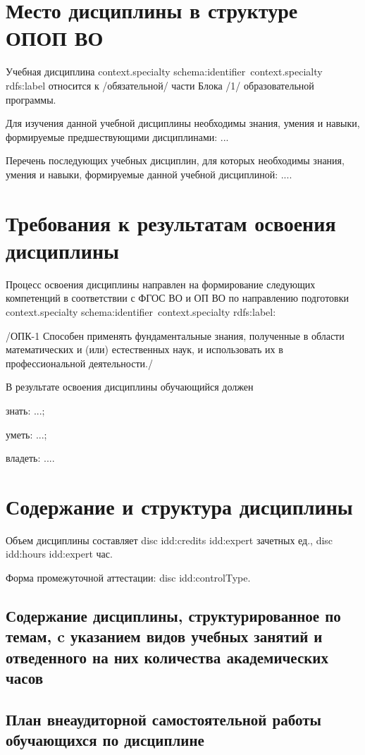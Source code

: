 \documentclass[12pt]{scrartcl}
\begin{document}
\section{Место дисциплины в структуре ОПОП ВО}
Учебная дисциплина {{context.specialty schema:identifier}}~{{context.specialty rdfs:label}} относится к /обязательной/ части Блока /1/ образовательной программы.

Для изучения данной учебной дисциплины необходимы знания, умения и навыки,
формируемые предшествующими дисциплинами: ...

Перечень последующих учебных дисциплин, для которых необходимы знания, умения и
навыки, формируемые данной учебной дисциплиной: ....


\section{Требования к результатам освоения дисциплины}

Процесс освоения дисциплины направлен на формирование следующих компетенций в
соответствии с ФГОС ВО и ОП ВО по направлению подготовки {{context.specialty schema:identifier}}~{{context.specialty rdfs:label}}:

/ОПК-1 Способен применять фундаментальные знания, полученные в области
математических и (или) естественных наук, и использовать их в профессиональной
деятельности./

В результате освоения дисциплины обучающийся должен

знать: ...;

уметь: ...;

владеть: ....

\section{Содержание и структура дисциплины}

Объем дисциплины составляет {{disc idd:credits idd:expert}} зачетных ед., {{disc idd:hours idd:expert}} час.

Форма промежуточной аттестации: {{disc idd:controlType}}.

\subsection{Содержание дисциплины, структурированное по темам, c указанием видов
  учебных занятий и отведенного на них количества академических часов}

\subsection{План внеаудиторной самостоятельной работы обучающихся по дисциплине}
\end{document}
